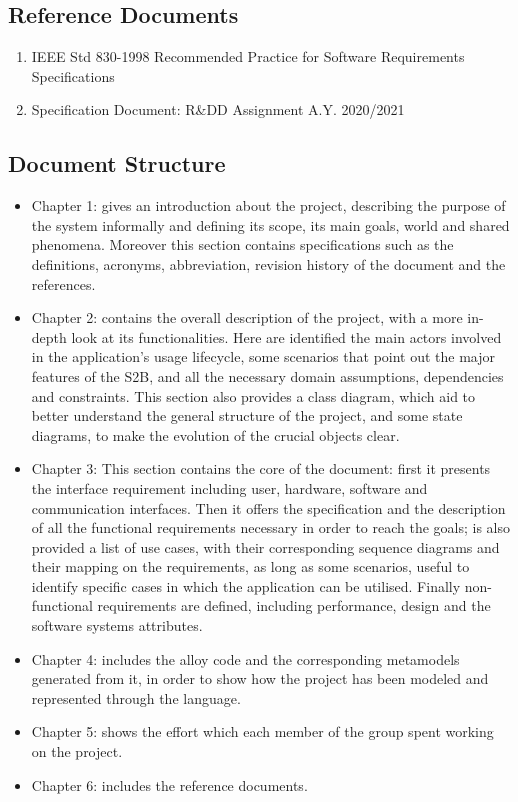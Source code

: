\subsection{Reference Documents}
\begin{enumerate}
	\item IEEE Std 830-1998 Recommended Practice for Software Requirements Specifications
	\item Specification Document: R\&DD Assignment A.Y. 2020/2021
\end{enumerate}
\subsection{Document Structure}
\begin{itemize}
	\item Chapter 1: gives an introduction about the project, describing the purpose of the    system informally and defining its scope, its main goals, world and shared phenomena. Moreover this section contains specifications such as the definitions, acronyms, abbreviation,	revision history of the document and the references.
	\item Chapter 2: contains the overall description of the project, with a more in-depth look at its functionalities. Here are identified the main actors involved in the application’s usage lifecycle, some scenarios that point out the major features of the S2B, and all the necessary domain assumptions, dependencies and constraints. This section also provides a class diagram, which aid to better understand the general structure of the project, and some state diagrams, to make the evolution of the crucial objects clear.
	\item Chapter 3: This section contains the core of the document: first it presents the interface requirement including user, hardware, software and communication interfaces.
	Then it offers the specification and the description of all the functional requirements necessary in order to reach the goals; is also provided a list of use cases, with their corresponding sequence diagrams and their mapping on the requirements, as long as some scenarios, useful to identify specific cases in which the application can be utilised.
	Finally non-functional requirements are defined, including performance, design and the software systems attributes.
	\item Chapter 4: includes the alloy code and the corresponding metamodels generated from it, in order to show how the project has been modeled and represented through the language.   
	\item Chapter 5: shows the effort which each member of the group spent working on the project.
	\item Chapter 6: includes the reference documents.
\end{itemize}

